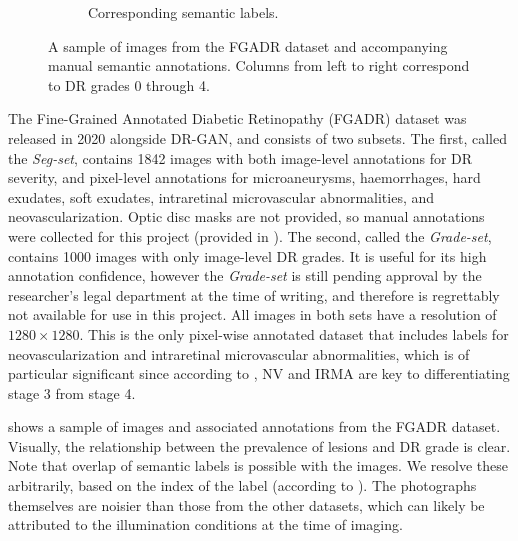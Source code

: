 \begin{figure}[h]
\begin{subfigure}{0.45\textwidth}
        \caption{Corresponding semantic labels.}
        \label{fig:fgadr_sample_label}
    \end{subfigure}
        \caption{A sample of images from the FGADR dataset and accompanying manual semantic annotations. Columns from left to right correspond to DR grades 0 through 4.}
    \label{fig:fgadr_sample}
\end{figure}

The Fine-Grained Annotated Diabetic Retinopathy (FGADR) dataset \cite{Zhou2020b} was released in 2020 alongside DR-GAN, and consists of two subsets.
The first, called the \emph{Seg-set}, contains 1842 images with both image-level annotations for DR severity, and pixel-level annotations for microaneurysms, haemorrhages, hard exudates, soft exudates, intraretinal microvascular abnormalities, and neovascularization.
Optic disc masks are not provided, so manual annotations were collected for this project (provided in ).
The second, called the \emph{Grade-set}, contains 1000 images with only image-level DR grades.
It is useful for its high annotation confidence, however the \emph{Grade-set} is still pending approval by the researcher's legal department at the time of writing, and therefore is regrettably not available for use in this project.
All images in both sets have a resolution of $1280 \times 1280$.
This is the only pixel-wise annotated dataset that includes labels for neovascularization and intraretinal microvascular abnormalities, which is of particular significant since according to , NV and IRMA are key to differentiating stage 3 from stage 4.

 shows a sample of images and associated annotations from the FGADR dataset.
Visually, the relationship between the prevalence of lesions and DR grade is clear.
Note that overlap of semantic labels is possible with the images.
We resolve these arbitrarily, based on the index of the label (according to ).
The photographs themselves are noisier than those from the other datasets, which can likely be attributed to the illumination conditions at the time of imaging.

% 

